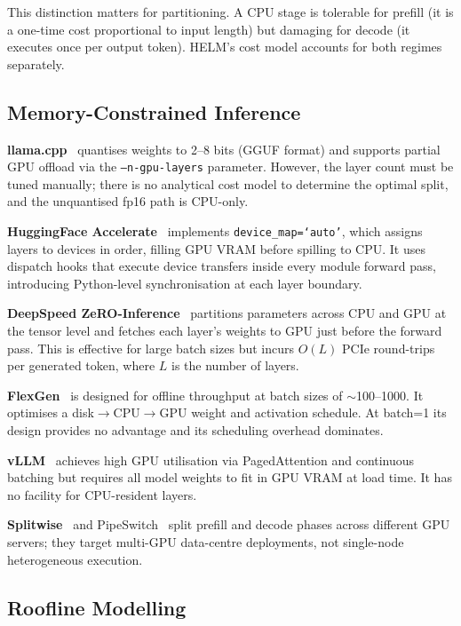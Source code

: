 \documentclass[lettersize,journal]{IEEEtran}
\begin{document}
This distinction matters for partitioning. A CPU stage is tolerable for
prefill (it is a one-time cost proportional to input length) but damaging
for decode (it executes once per output token). HELM's cost model accounts
for both regimes separately.

\subsection{Memory-Constrained Inference}

\textbf{llama.cpp}~\cite{llamacpp} quantises weights to 2--8 bits (GGUF
format) and supports partial GPU offload via the \texttt{--n-gpu-layers}
parameter. However, the layer count must be tuned manually; there is no
analytical cost model to determine the optimal split, and the unquantised
fp16 path is CPU-only.

\textbf{HuggingFace Accelerate}~\cite{accelerate} implements
\texttt{device\_map=`auto'}, which assigns layers to devices in order,
filling GPU VRAM before spilling to CPU. It uses dispatch hooks that execute
device transfers inside every module forward pass, introducing Python-level
synchronisation at each layer boundary.

\textbf{DeepSpeed ZeRO-Inference}~\cite{deepspeed} partitions parameters
across CPU and GPU at the tensor level and fetches each layer's weights to
GPU just before the forward pass. This is effective for large batch sizes but
incurs $O(L)$ PCIe round-trips per generated token, where $L$ is the number
of layers.

\textbf{FlexGen}~\cite{flexgen} is designed for offline throughput at batch
sizes of $\sim$100--1000. It optimises a disk$\to$CPU$\to$GPU weight and
activation schedule. At batch=1 its design provides no advantage and its
scheduling overhead dominates.

\textbf{vLLM}~\cite{vllm} achieves high GPU utilisation via PagedAttention
and continuous batching but requires all model weights to fit in GPU VRAM at
load time. It has no facility for CPU-resident layers.

\textbf{Splitwise}~\cite{splitwise} and PipeSwitch~\cite{pipeswitch} split
prefill and decode phases across different GPU servers; they target
multi-GPU data-centre deployments, not single-node heterogeneous execution.

\subsection{Roofline Modelling}
\end{document}
